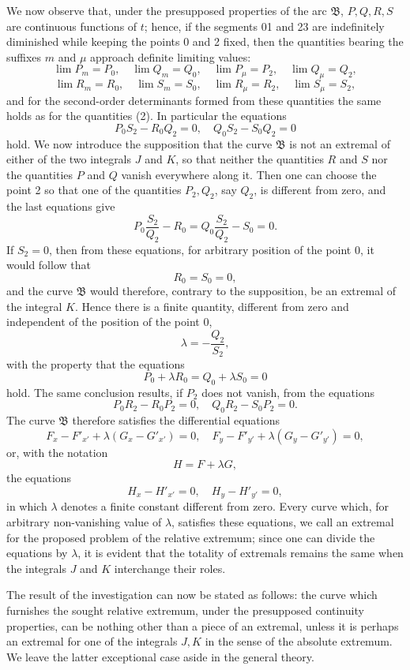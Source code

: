 \documentclass[11pt,a4paper,leqno]{article}
\begin{document}
We now observe that, under the presupposed properties of the arc $\mathfrak{B}$, $P,Q,R,S$ are continuous functions of $t$; hence, if the segments 01 and 23 are indefinitely diminished while keeping the points 0 and 2 fixed, then the quantities bearing the suffixes $m$ and $\mu$ approach definite limiting values:
\[
\lim P_m=P_0,
\quad
\lim Q_m=Q_0,
\quad
\lim P_\mu=P_2,
\quad
\lim Q_\mu=Q_2,
\]
\[
\lim R_m=R_0,
\quad
\lim S_m=S_0,
\quad
\lim R_\mu=R_2,
\quad
\lim S_\mu=S_2,
\]
and for the second-order determinants formed from these quantities the same holds as for the quantities (2). In particular the equations
\[
P_0S_2-R_0Q_2=0,
\quad
Q_0S_2-S_0Q_2=0
\]
hold. We now introduce the supposition that the curve $\mathfrak{B}$ is not an extremal of either of the two integrals $J$ and $K$, so that neither the quantities $R$ and $S$ nor the quantities $P$ and $Q$ vanish everywhere along it. Then one can choose the point 2 so that one of the quantities $P_2,Q_2$, say $Q_2$, is different from zero, and the last equations give
\[
P_0\frac{S_2}{Q_2}-R_0=Q_0\frac{S_2}{Q_2}-S_0=0.
\]
If $S_2=0$, then from these equations, for arbitrary position of the point 0, it would follow that
\[
R_0=S_0=0,
\]
and the curve $\mathfrak{B}$ would therefore, contrary to the supposition, be an extremal of the integral $K$. Hence there is a finite quantity, different from zero and independent of the position of the point 0,
\[
\lambda=-\frac{Q_2}{S_2},
\]
with the property that the equations
\[
P_0+\lambda R_0=Q_0+\lambda S_0=0
\]
hold. The same conclusion results, if $P_2$ does not vanish, from the equations
\[
P_0R_2-R_0P_2=0,
\quad
Q_0R_2-S_0P_2=0.
\]
The curve $\mathfrak{B}$ therefore satisfies the differential equations
\[
F_x-F'_{x'}+\lambda(G_x-G'_{x'})=0,
\quad
F_y-F'_{y'}+\lambda(G_y-G'_{y'})=0,
\]
or, with the notation
\[
H=F+\lambda G,
\]
the equations
\[
H_x-H'_{x'}=0,
\quad
H_y-H'_{y'}=0,
\]
in which $\lambda$ denotes a finite constant different from zero. Every curve which, for arbitrary non-vanishing value of $\lambda$, satisfies these equations, we call an extremal for the proposed problem of the relative extremum; since one can divide the equations by $\lambda$, it is evident that the totality of extremals remains the same when the integrals $J$ and $K$ interchange their roles.

The result of the investigation can now be stated as follows: the curve which furnishes the sought relative extremum, under the presupposed continuity properties, can be nothing other than a piece of an extremal, unless it is perhaps an extremal for one of the integrals $J,K$ in the sense of the absolute extremum. We leave the latter exceptional case aside in the general theory.
\end{document}
